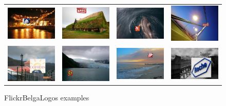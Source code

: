 \begin{figure}
  \centering
\begin{tabular}{cccc}
  \includegraphics[width=25mm]{images/mt/flbl1.jpg} &   \includegraphics[width=25mm]{images/mt/flbl2.jpg}  & \includegraphics[width=25mm]{images/mt/flbl3.jpg} &   \includegraphics[width=25mm]{images/mt/flbl4.jpg} \\
    \includegraphics[width=25mm]{images/mt/flbl5.jpg} &   \includegraphics[width=25mm]{images/mt/flbl6.jpg}  & \includegraphics[width=25mm]{images/mt/flbl7.jpg} &   \includegraphics[width=25mm]{images/mt/flbl8.jpg} 
\end{tabular}
\caption{FlickrBelgaLogos examples}
\end{figure}

